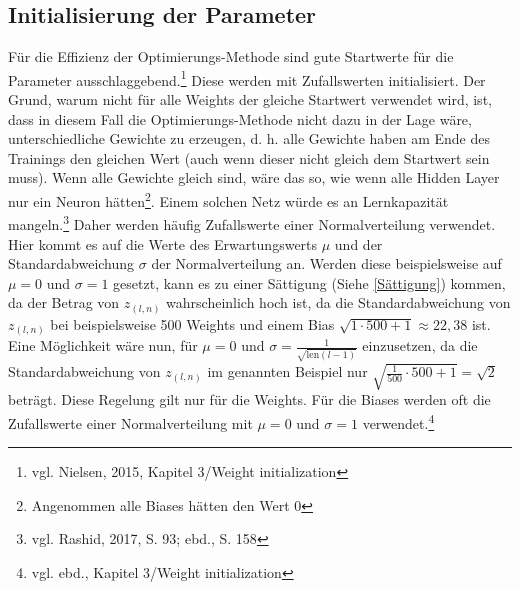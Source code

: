 \documentclass[a4paper,12pt,ngerman,oneside]{scrreprt}	%
\begin{document}
			\subsection{Initialisierung der Parameter} \label{TodsündenWeights}
			\enlargethispage{0.2\baselineskip}
			Für die Effizienz der Optimierungs-Methode sind gute Startwerte für die Parameter ausschlaggebend.\footnote{vgl. Nielsen, 2015, Kapitel 3/Weight initialization} Diese werden mit Zufallswerten initialisiert. Der Grund, warum nicht für alle Weights der gleiche Startwert verwendet wird, ist, dass in diesem Fall die Optimierungs-Methode nicht dazu in der Lage wäre, unterschiedliche Gewichte zu erzeugen, d. h. alle Gewichte haben am Ende des Trainings den gleichen Wert (auch wenn dieser nicht gleich dem Startwert sein muss). Wenn alle Gewichte gleich sind, wäre das so, wie wenn alle Hidden Layer nur ein Neuron hätten\footnote{Angenommen alle Biases hätten den Wert 0}. Einem solchen Netz würde es an Lernkapazität mangeln.\footnote{vgl. Rashid, 2017, S. 93; ebd., S. 158}
			Daher werden häufig Zufallswerte einer Normalverteilung verwendet. Hier kommt es auf die Werte des Erwartungswerts $\mu$ und der Standardabweichung $\sigma$ der Normalverteilung an. Werden diese beispielsweise auf $\mu = 0$ und $\sigma = 1$ gesetzt, kann es zu einer Sättigung (Siehe \ref{Sättigung}) kommen, da der Betrag von $z_{(l,n)}$ wahrscheinlich hoch ist, da die Standardabweichung von $z_{(l,n)}$ bei beispielsweise 500 Weights und einem Bias $\sqrt{1 \cdot 500 + 1} \approx 22,38$ ist. Eine Möglichkeit wäre nun, für $\mu = 0$ und $\sigma = \frac{1}{\sqrt{\textrm{len}(l-1)}}$ einzusetzen, da die Standardabweichung von $z_{(l,n)}$ im genannten Beispiel nur $\sqrt{\frac{1}{500} \cdot 500 + 1} = \sqrt{2}$ beträgt. Diese Regelung gilt nur für die Weights. Für die Biases werden oft die Zufallswerte einer Normalverteilung mit $\mu = 0$ und $\sigma = 1$ verwendet.\footnote{vgl. ebd., Kapitel 3/Weight initialization}
			
			
\end{document}
